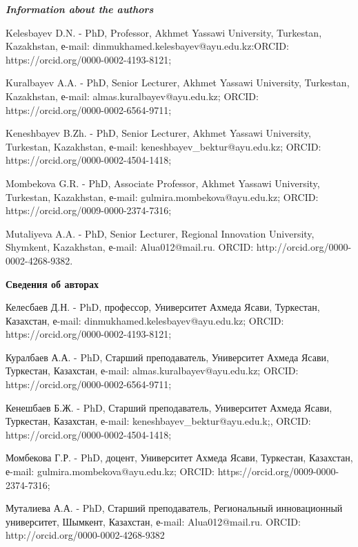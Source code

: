 \begin{authorinfo}
\emph{{\bfseries Information about the authors}}

Kelesbayev D.N. - PhD, Professor, Akhmet Yassawi University, Turkestan,
Kazakhstan, е-mail: dinmukhamed.kelesbayev@ayu.edu.kz:ORCID:
https://orcid.org/0000-0002-4193-8121;

Kuralbayev A.A. - PhD, Senior Lecturer, Akhmet Yassawi University,
Turkestan, Kazakhstan, е-mail: almas.kuralbayev@ayu.edu.kz; ORCID:
https://orcid.org/0000-0002-6564-9711;

Keneshbayev B.Zh. - PhD, Senior Lecturer, Akhmet Yassawi University,
Turkestan, Kazakhstan, е-mail: keneshbayev\_bektur@ayu.edu.kz; ORCID:
https://orcid.org/0000-0002-4504-1418;

Mombekova G.R. - PhD, Associate Professor, Akhmet Yassawi University,
Turkestan, Kazakhstan, е-mail: gulmira.mombekova@ayu.edu.kz; ORCID:
https://orcid.org/0009-0000-2374-7316;

Mutaliyeva A.A. - PhD, Senior Lecturer, Regional Innovation University,
Shymkent, Kazakhstan, е-mail: Alua012@mail.ru. ORCID:
http://orcid.org/0000-0002-4268-9382.

{\bfseries Сведения об авторах}

Келесбаев Д.Н. - PhD, профессор, Университет Ахмеда Ясави, Туркестан,
Казахстан, е-mail: dinmukhamed.kelesbayev@ayu.edu.kz; ORCID:
https://orcid.org/0000-0002-4193-8121;

Куралбаев А.А. - PhD, Старший преподаватель, Университет Ахмеда Ясави,
Туркестан, Казахстан, е-mail: almas.kuralbayev@ayu.edu.kz; ORCID:
https://orcid.org/0000-0002-6564-9711;

Кенешбаев Б.Ж. - PhD, Старший преподаватель, Университет Ахмеда Ясави,
Туркестан, Казахстан, е-mail: keneshbayev\_bektur@ayu.edu.k;, ORCID:
https://orcid.org/0000-0002-4504-1418;

Момбекова Г.Р. - PhD, доцент, Университет Ахмеда Ясави, Туркестан,
Казахстан, е-mail: gulmira.mombekova@ayu.edu.kz; ORCID:
https://orcid.org/0009-0000-2374-7316;

Муталиева А.А. - PhD, Старший преподаватель, Региональный инновационный
университет, Шымкент, Казахстан, е-mail: Alua012@mail.ru. ORCID:
http://orcid.org/0000-0002-4268-9382
\end{authorinfo}
